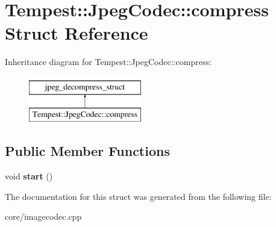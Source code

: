 \hypertarget{struct_tempest_1_1_jpeg_codec_1_1compress}{\section{Tempest\+:\+:Jpeg\+Codec\+:\+:compress Struct Reference}
\label{struct_tempest_1_1_jpeg_codec_1_1compress}
}
Inheritance diagram for Tempest\+:\+:Jpeg\+Codec\+:\+:compress\+:\begin{figure}[H]
\begin{center}
\leavevmode
\includegraphics[height=2.000000cm]{struct_tempest_1_1_jpeg_codec_1_1compress}
\end{center}
\end{figure}
\subsection*{Public Member Functions}
\begin{DoxyCompactItemize}
\item 
\hypertarget{struct_tempest_1_1_jpeg_codec_1_1compress_a78443bef7f4972c27822550c53c9b97e}{void {\bfseries start} ()}\label{struct_tempest_1_1_jpeg_codec_1_1compress_a78443bef7f4972c27822550c53c9b97e}

\end{DoxyCompactItemize}


The documentation for this struct was generated from the following file\+:\begin{DoxyCompactItemize}
\item 
core/imagecodec.\+cpp\end{DoxyCompactItemize}
